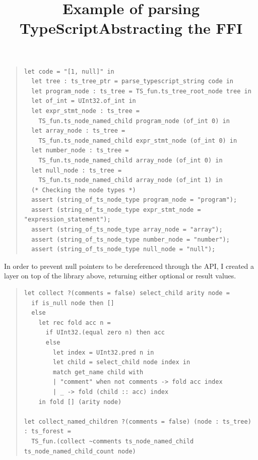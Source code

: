 \documentclass[wide]{slides}
\begin{document}
\begin{slide}
  \title{Example of parsing TypeScript}
  \begin{quote}
    \small
    \begin{lstlisting}[language=caml]
  let code = "[1, null]" in
  let tree : ts_tree_ptr = parse_typescript_string code in
  let program_node : ts_tree = TS_fun.ts_tree_root_node tree in
  let of_int = UInt32.of_int in
  let expr_stmt_node : ts_tree =
    TS_fun.ts_node_named_child program_node (of_int 0) in
  let array_node : ts_tree =
    TS_fun.ts_node_named_child expr_stmt_node (of_int 0) in
  let number_node : ts_tree =
    TS_fun.ts_node_named_child array_node (of_int 0) in
  let null_node : ts_tree =
    TS_fun.ts_node_named_child array_node (of_int 1) in
  (* Checking the node types *)
  assert (string_of_ts_node_type program_node = "program");
  assert (string_of_ts_node_type expr_stmt_node = "expression_statement");
  assert (string_of_ts_node_type array_node = "array");
  assert (string_of_ts_node_type number_node = "number");
  assert (string_of_ts_node_type null_node = "null");
    \end{lstlisting}
  \end{quote}

\end{slide}

\begin{slide}
  \title{Abstracting the FFI}

   In order to prevent null pointers to be dereferenced through the
   API, I created a layer on top of the library above, returning
   either optional or result values.
   \begin{quote}
     \small
     \begin{lstlisting}[language=caml]
let collect ?(comments = false) select_child arity node =
  if is_null node then []
  else
    let rec fold acc n =
      if UInt32.(equal zero n) then acc
      else
        let index = UInt32.pred n in
        let child = select_child node index in
        match get_name child with
        | "comment" when not comments -> fold acc index
        | _ -> fold (child :: acc) index
    in fold [] (arity node)

let collect_named_children ?(comments = false) (node : ts_tree) : ts_forest =
  TS_fun.(collect ~comments ts_node_named_child ts_node_named_child_count node)
     \end{lstlisting}
   \end{quote}

\end{slide}
\end{document}
